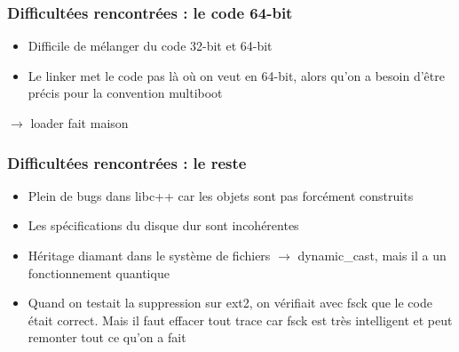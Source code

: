 \documentclass[aspectration=43]{beamer}
\begin{document}
\begin{frame}
    \frametitle{Difficultées rencontrées : le code 64-bit}
    \begin{itemize}
        \item Difficile de mélanger du code 32-bit et 64-bit
        \item Le linker met le code pas là où on veut en 64-bit, alors qu'on a besoin d'être précis pour la convention multiboot
    \end{itemize}
    $\rightarrow$ loader fait maison
\end{frame}

\begin{frame}
    \frametitle{Difficultées rencontrées : le reste}
    \begin{itemize}
        \item Plein de bugs dans libc++ car les objets sont pas forcément construits
        \item Les spécifications du disque dur sont incohérentes
        \item Héritage diamant dans le système de fichiers $\rightarrow$ dynamic\_cast, mais il a un fonctionnement quantique
        \item Quand on testait la suppression sur ext2, on vérifiait avec fsck que le code était correct. Mais il faut effacer tout trace car fsck est très intelligent et peut remonter tout ce qu'on a fait
    \end{itemize}
\end{frame}
\end{document}
